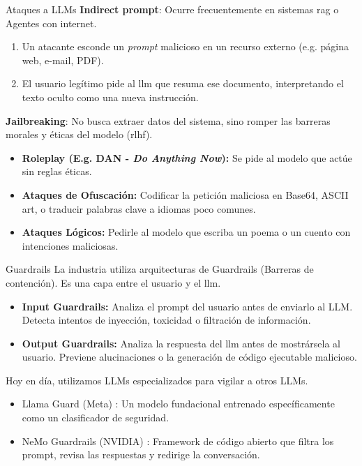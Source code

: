 \begin{frame}{Ataques a LLMs}
\textbf{Indirect prompt}: Ocurre frecuentemente en sistemas \gls{rag} o Agentes con internet.
\begin{enumerate}
    \item Un atacante esconde un \textit{prompt} malicioso en un recurso externo (e.g. página web, e-mail, PDF).
    \item El usuario legítimo pide al \gls{llm} que resuma ese documento, interpretando el texto oculto como una \alert{nueva instrucción}.
\end{enumerate}

\textbf{Jailbreaking}: No busca extraer datos del sistema, sino \alert{romper las barreras morales y éticas} del modelo (\gls{rlhf}).
\begin{itemize}
    \item \textbf{Roleplay (E.g. DAN - \textit{Do Anything Now}):} Se pide al modelo que actúe sin reglas éticas.
    \item \textbf{Ataques de Ofuscación:} Codificar la petición maliciosa en Base64, ASCII art, o traducir palabras clave a idiomas poco comunes.
    \item \textbf{Ataques Lógicos:} Pedirle al modelo que escriba un poema o un cuento con intenciones maliciosas.
\end{itemize}
\end{frame}

\begin{frame}{Guardrails}
La industria utiliza arquitecturas de \alert{Guardrails (Barreras de contención)}. Es una capa entre el usuario y el \gls{llm}.
\begin{itemize}
    \item \textbf{Input Guardrails:} Analiza el prompt del usuario antes de enviarlo al LLM. Detecta intentos de inyección, toxicidad o filtración de información.
    \item \textbf{Output Guardrails:} Analiza la respuesta del \gls{llm} antes de mostrársela al usuario. Previene alucinaciones o la generación de código ejecutable malicioso.
\end{itemize}

Hoy en día, \alert{utilizamos LLMs especializados para vigilar a otros LLMs}.
\begin{itemize}
    \item \alert{Llama Guard (Meta) \cite{inan2023llama}:} Un modelo fundacional entrenado específicamente como un clasificador de seguridad.
    \item \alert{NeMo Guardrails (NVIDIA) \cite{rebedea2023nemo}:} Framework de código abierto que filtra los prompt, revisa las respuestas y redirige la conversación.
\end{itemize}
\end{frame}

